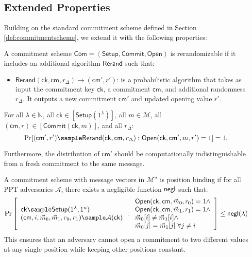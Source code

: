 \subsection{Extended Properties}

Building on the standard commitment scheme defined in Section \ref{def:commitmentscheme}, we extend it with the following properties:

\begin{definition}[Rerandomizability]
A commitment scheme $\mathsf{Com} = (\mathsf{Setup}, \mathsf{Commit}, \mathsf{Open})$ is rerandomizable if it includes an additional algorithm $\mathsf{Rerand}$ such that:

\begin{itemize}
\item $\mathsf{Rerand}(\mathsf{ck}, \mathsf{cm}, r_\Delta) \rightarrow (\mathsf{cm}', r')$: is a probabilistic algorithm that takes as input the commitment key $\mathsf{ck}$, a commitment $\mathsf{cm}$, and additional randomness $r_\Delta$. It outputs a new commitment $\mathsf{cm}'$ and updated opening value $r'$.
\end{itemize}

For all $\lambda \in \mathbb{N}$, all $\mathsf{ck} \in [\mathsf{Setup}(1^\lambda)]$, all $m \in \mathcal{M}$, all $(\mathsf{cm}, r) \in [\mathsf{Commit}(\mathsf{ck}, m)]$, and all $r_\Delta$:
$$\Pr[(\mathsf{cm}', r') \sample \mathsf{Rerand}(\mathsf{ck}, \mathsf{cm}, r_\Delta) : \mathsf{Open}(\mathsf{ck}, \mathsf{cm}', m, r') = 1] = 1.$$

Furthermore, the distribution of $\mathsf{cm}'$ should be computationally indistinguishable from a fresh commitment to the same message.
\end{definition}


\begin{definition}
A commitment scheme with message vectors in $\mathcal{M}^n$ is position binding if for all PPT adversaries $\mathcal{A}$, there exists a negligible function $\mathsf{negl}$ such that:
\[
    \Pr
    \left[
        \begin{array}{l}
        \mathsf{ck} \sample \mathsf{Setup}(1^\lambda, 1^n) \\
        (\mathsf{cm}, i, \vec{m}_0, \vec{m}_1, r_0, r_1) \sample \mathcal{A}(\mathsf{ck}) 
        \end{array}
        : \begin{array}{l}
            \mathsf{Open}(\mathsf{ck}, \mathsf{cm}, \vec{m}_0, r_0) = 1 \land \\
            \mathsf{Open}(\mathsf{ck}, \mathsf{cm}, \vec{m}_1, r_1) = 1 \land \\
            \vec{m}_0[i] \neq \vec{m}_1[i] \land \\
            \vec{m}_0[j] = \vec{m}_1[j] \; \forall j \neq i
          \end{array}
    \right] \leq \negl(\lambda)
\]
This ensures that an adversary cannot open a commitment to two different values at any single position while keeping other positions constant.
\end{definition}

